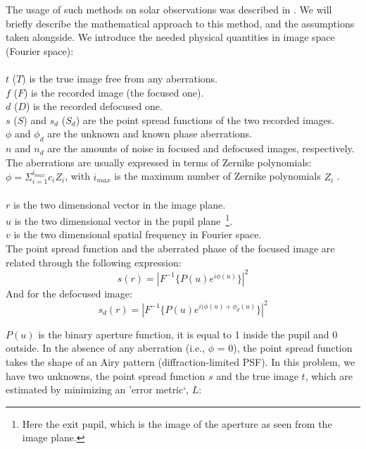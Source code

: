 \documentclass[goettingen, gauss, print]{thesis}
\begin{document}
The usage of such methods on solar observations was described in \cite{lofdahl_wavefront_1994}. We will briefly describe the mathematical approach to this method, and the assumptions taken alongside.
We introduce the needed physical quantities in image space (Fourier space):\\ \\
$t$ ($T$) is the true image free from any aberrations.\\
$f$ ($F$) is the recorded image (the focused one).\\
$d$ ($D$) is the recorded defocused one.\\ %
$s$ ($S$) and $s_d$ ($S_d$) are the point spread functions of the two recorded images.\\ 
$\phi$ and $\phi_d$ are the unknown and known phase aberrations. \\
$n$ and $n_d$ are the amounts of noise in focused and defocused images, respectively. \\
The aberrations are usually expressed in terms of Zernike polynomials:
$\phi = \Sigma_{i=1}^{i_{max}} c_i Z_i$, with $i_{max}$ is the maximum number of Zernike polynomials $Z_i$ \citep{noll_zernike_1976}. \\ \\
$r$ is the two dimensional vector in the image plane. \\
$u$ is the two dimensional vector in the pupil plane~\footnote{Here the exit pupil, which is the image of the aperture as seen from the image plane.}. \\
$v$ is the two dimensional spatial frequency in Fourier space. \\


The point spread function and the aberrated phase of the focused image are related through the following expression:
\begin{equation}
s(r) = |F^{-1} \{ P(u) e^{i\phi(u)} \} |^2
\label{psf}
\end{equation}
And for the defocused image:
\begin{equation}
s_d(r) = |F^{-1} \{ P(u) e^{i(\phi(u)+\phi_d(u)} \} |^2
\end{equation}

$P(u)$ is the binary aperture function, it is equal to 1 inside the pupil and 0 outside. In the absence of any aberration (i.e., $\phi$ = 0), the point spread function takes the shape of an Airy pattern (diffraction-limited PSF).
In this problem, we have two unknowns, the point spread function $s$ and the true image $t$, which are estimated by minimizing an 'error metric`, $L$:
\end{document}
